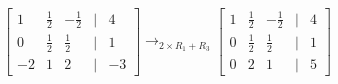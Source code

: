 \documentclass[preview]{standalone}
\begin{document}
\begin{align*}
\begin{bmatrix} 1 & \frac{1}{2} & -\frac{1}{2} & | & 4 \\ 0 & \frac{1}{2} & \frac{1}{2} & | & 1 \\ -2 & 1 & 2 & | & -3 \end{bmatrix} \rightarrow_{2\times R_1 + R_3} \begin{bmatrix} 1 & \frac{1}{2} & -\frac{1}{2} & | & 4 \\ 0 & \frac{1}{2} & \frac{1}{2} & | & 1 \\ 0 & 2 & 1 & | & 5 \end{bmatrix}
\end{align*}
\end{document}
